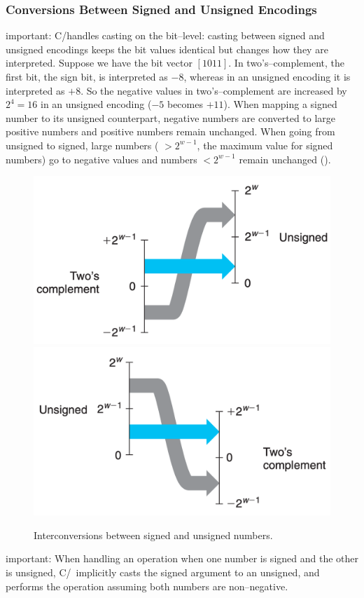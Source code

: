 \documentclass[../bryant_comp_sys.tex]{subfiles}
\begin{document}
            \subsubsection{Conversions Between Signed and Unsigned Encodings}
                \begin{outline}
                    \1 \alert{important}: C/\Cpp handles casting on the bit--level: casting between signed and unsigned encodings keeps the bit values identical but changes how they are interpreted.
                        \2 Suppose we have the bit vector \( \left[ 1011 \right] \).
                            \3 In two's--complement, the first bit, the sign bit, is interpreted as \( -8 \), whereas in an unsigned encoding it is interpreted as \( +8 \). So the negative values in two's--complement are increased by \( 2^4 = 16 \) in an unsigned encoding (\(-5\) becomes \(+11\)).
                    \1 When mapping a signed number to its unsigned counterpart, negative numbers are converted to large positive numbers and positive numbers remain unchanged. When going from unsigned to signed, large numbers ( \( >2^{w-1} \), the maximum value for signed numbers) go to negative values and numbers \( <2^{w-1} \) remain unchanged ().

                    \begin{figure}[h]
                        \centering
                        \includegraphics[width=0.4\linewidth]{ch2/figs/signed_to_unsigned.png}
                        \includegraphics[width=0.4\linewidth]{ch2/figs/unsigned_to_signed.png}
                        \caption{Interconversions between signed and unsigned numbers.}
                        \label{fig:encodingConversion}
                    \end{figure}

                    \1 \alert{important}: When handling an operation when one number is signed and the other is unsigned, C/\Cpp~implicitly casts the signed argument to an unsigned, and performs the operation assuming both numbers are non--negative.
                \end{outline}
\end{document}
